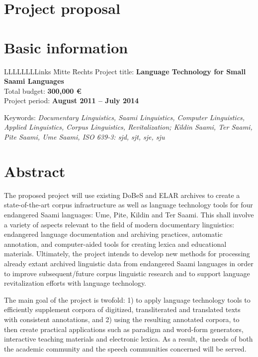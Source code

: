 \documentclass[a4paper,12pt]{article}
\begin{document}
\newpage

\section*{Project proposal}

\section{Basic information}

\begin{tabbing}
LLLLLLLLinks \= Mitte \= Rechts \kill
Project title: \>\textbf{Language Technology for Small Saami Languages}\\
Total budget: \>\textbf{300,000 €}\\
Project period: \>\textbf{August 2011 – July 2014}\\
\end{tabbing}
Keywords: {\it Documentary Linguistics, Saami Linguistics, Computer Linguistics, Applied Linguistics, Corpus Linguistics, Revitalization; Kildin Saami, Ter Saami, Pite Saami, Ume Saami, ISO 639-3: sjd, sjt, sje, sju}

\section{Abstract}%
The proposed project will use existing DoBeS and ELAR archives to create a state-of-the-art corpus infrastructure as well as language technology tools for four endangered Saami languages: Ume, Pite, Kildin and Ter Saami. This shall involve a variety of aspects relevant to the field of modern documentary linguistics: endangered language documentation and archiving practices, automatic annotation, and computer-aided tools for creating lexica and educational materials. Ultimately, the project intends to develop new methods for processing already extant archived linguistic data from endangered Saami languages in order to improve subsequent/future corpus linguistic research and to support language revitalization efforts with language technology.

The main goal of the project is twofold: 1) to apply language technology tools to efficiently supplement corpora of digitized, transliterated and translated texts with consistent annotations, and 2) using the resulting annotated corpora, to then create practical applications such as paradigm and word-form generators, interactive teaching materials and electronic lexica. As a result, the needs of both the academic community and the speech communities concerned will be served.
\end{document}
